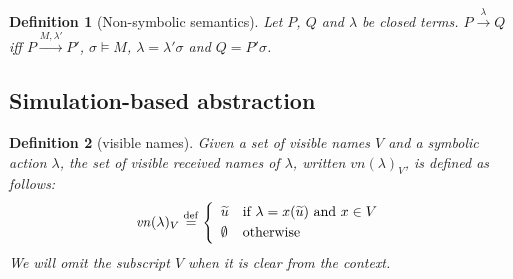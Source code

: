 \documentclass[submission,copyright,creativecommons]{eptcs}
\newcommand{\inp}[2]{#1(#2)}
\newcommand{\vn}{\mathit{vn}}
\newcommand{\tuple}[1]{\widetilde{#1}}
\newcommand{\act}{\lambda}
\newtheorem{definition1}{Definition}
\begin{document}
\begin{definition1}[Non-symbolic semantics] \label{def:alt-non-symb-sem}
Let $P$, $Q$ and $\lambda$ be closed terms. $P\xrightarrow{\lambda} Q$ iff  $P\xrightarrow{M,\lambda'} P'$, $\sigma\models M $, $\lambda = \lambda'\sigma$ and $Q = P'\sigma$.
\end{definition1}



\subsection{Simulation-based abstraction}


\begin{definition1}[visible names] Given a set of visible names $V$ and
a symbolic action $\act$, the set of visible received names of $\act$, written
$\vn({\act})_V$, is defined as follows:
   \[
   \vn({\act})_V \mathrel{\mathop{=}\limits^{\rm def}}   
     \left \{ 
             {\begin{array}{ll}
              \tuple{u} & \mbox{if $\act = \inp x {\tuple u}$ and $x\in V$}\\[1mm]
              \emptyset & \mbox{otherwise}\\ 
              \end{array}}
      \right .
 \]
We will omit the subscript $V$ when it is clear from the context.
\end{definition1}
\end{document}
